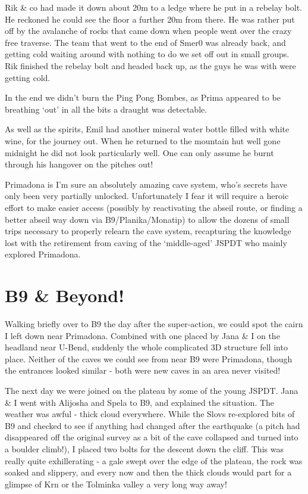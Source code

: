 Rik \& co had made it down about 20m to a ledge where he put in a
rebelay bolt. He reckoned he could see the floor a further 20m from
there. He was rather put off by the avalanche of rocks that came down
when people went over the crazy free traverse. The team that went to the
end of Smer0 was already back, and getting cold waiting around with
nothing to do we set off out in small groups. Rik finished the rebelay
bolt and headed back up, as the guys he was with were getting cold.

In the end we didn't burn the Ping Pong Bombes, as Prima appeared to be
breathing `out' in all the bits a draught was detectable.

As well as the spirits, Emil had another mineral water bottle filled
with white wine, for the journey out. When he returned to the mountain
hut well gone midnight he did not look particularly well. One can only
assume he burnt through his hangover on the pitches out!

Primadona is I'm sure an absolutely amazing cave system, who's secrets
have only been very partially unlocked. Unfortunately I fear it will
require a heroic effort to make easier access (possibly by reactivating
the abseil route, or finding a better abseil way down via
B9/Planika/Monatip) to allow the dozens of small trips necessary to
properly relearn the cave system, recapturing the knowledge lost with
the retirement from caving of the `middle-aged' JSPDT who mainly
explored Primadona.


\section{B9 \& Beyond!}\label{b9-beyond}

Walking briefly over to B9 the day after the super-action, we could spot
the cairn I left down near Primadona. Combined with one placed by Jana
\& I on the headland near U-Bend, suddenly the whole complicated 3D
structure fell into place. Neither of the caves we could see from near
B9 were Primadona, though the entrances looked similar - both were new
caves in an area never visited!

The next day we were joined on the plateau by some of the young JSPDT.
Jana \& I went with Alijosha and Spela to B9, and explained the
situation. The weather was awful - thick cloud everywhere. While the
Slovs re-explored bits of B9 and checked to see if anything had changed
after the earthquake (a pitch had disappeared off the original survey as
a bit of the cave collapsed and turned into a boulder climb!), I placed
two bolts for the descent down the cliff. This was really quite
exhillerating - a gale swept over the edge of the plateau, the rock was
soaked and slippery, and every now and then the thick clouds would part
for a glimpse of Krn or the Tolminka valley a very long way away!

